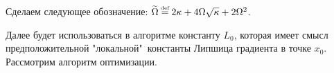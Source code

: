 \documentclass[11pt,a4]{article}
\newcommand{\norm}[1]{\left\lVert#1\right\rVert}
\newcommand\myeq{\mathrel{\stackrel{\makebox[0pt]{\mbox{\normalfont\tiny def}}}{=}}}
\begin{document}
\iffalse
Возьмем математическое ожидание от неравенства
\begin{gather*}
f_\delta(x) - f_\delta(y) - \mathbb{E}\langle\widetilde{\nabla}^{m_{k+1}} f_\delta(y), x - y\rangle \leq\\ \leq\frac{2}{L}\mathbb{E}\norm{\widetilde{\nabla}^{m_{k+1}} f_\delta(y) - \nabla f_\delta(y)}^2_* + \frac{3L}{4}\norm{x - y}^2 + \delta\\
\end{gather*}
То есть, мы получили, что из (\ref{exitLDLOrig2}) следует
\begin{gather*}
f_\delta(x) - f_\delta(y) - \mathbb{E}\langle\widetilde{\nabla}^{m_{k+1}} f_\delta(y), x - y\rangle \leq\frac{2\sigma^2}{Lm_{k+1}} + \frac{3L}{4}\norm{x - y}^2 + \delta\\
\end{gather*}
\fi

Сделаем следующее обозначение: $\widetilde{\Omega} \myeq 2\kappa + 4\Omega\sqrt{\kappa} + 2\Omega^2$. 

Далее будет использоваться в алгоритме константу $L_0$, которая имеет смысл предположительной "локальной"\, константы Липшица градиента в точке $x_0$. Рассмотрим алгоритм оптимизации.
\end{document}
